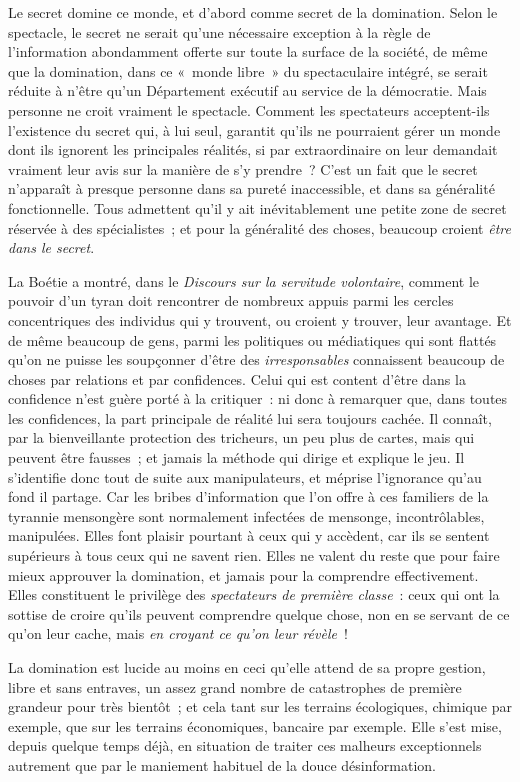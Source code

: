 \documentclass[french,twoside]{book} %
\def\mednobreak{\ifdim\lastskip<\medskipamount
  \removelastskip\nopagebreak\medskip\fi}
\newcommand{\labelblock}[1]{\medbreak{\noindent\color{rubric}\bfseries #1}\par\mednobreak}
\begin{document}
\labelblock{XXI}

\noindent Le secret domine ce monde, et d’abord comme secret de la domination. Selon le spectacle, le secret ne serait qu’une nécessaire exception à la règle de l’information abondamment offerte sur toute la surface de la société, de même que la domination, dans ce « monde libre » du spectaculaire intégré, se serait réduite à n’être qu’un Département exécutif au service de la démocratie. Mais personne ne croit vraiment le spectacle. Comment les spectateurs acceptent-ils l’existence du secret qui, à lui seul, garantit qu’ils ne pourraient gérer un monde dont ils ignorent les principales réalités, si par extraordinaire on leur demandait vraiment leur avis sur la manière de s’y prendre ? C’est un fait que le secret n’apparaît à presque personne dans sa pureté inaccessible, et dans sa généralité fonctionnelle. Tous admettent qu’il y ait inévitablement une petite zone de secret réservée à des spécialistes ; et pour la généralité des choses, beaucoup croient \emph{être dans le secret}.\par
La Boétie a montré, dans le \emph{Discours sur la servitude volontaire}, comment le pouvoir d’un tyran doit rencontrer de nombreux appuis parmi les cercles concentriques des individus qui y trouvent, ou croient y trouver, leur avantage. Et de même beaucoup de gens, parmi les politiques ou médiatiques qui sont flattés qu’on ne puisse les soupçonner d’être des \emph{irresponsables} connaissent beaucoup de choses par relations et par confidences. Celui qui est content d’être dans la confidence n’est guère porté à la critiquer : ni donc à remarquer que, dans toutes les confidences, la part principale de réalité lui sera toujours cachée. Il connaît, par la bienveillante protection des tricheurs, un peu plus de cartes, mais qui peuvent être fausses ; et jamais la méthode qui dirige et explique le jeu. Il s’identifie donc tout de suite aux manipulateurs, et méprise l’ignorance qu’au fond il partage. Car les bribes d’information que l’on offre à ces familiers de la tyrannie mensongère sont normalement infectées de mensonge, incontrôlables, manipulées. Elles font plaisir pourtant à ceux qui y accèdent, car ils se sentent supérieurs à tous ceux qui ne savent rien. Elles ne valent du reste que pour faire mieux approuver la domination, et jamais pour la comprendre effectivement. Elles constituent le privilège des \emph{spectateurs de première classe} : ceux qui ont la sottise de croire qu’ils peuvent comprendre quelque chose, non en se servant de ce qu’on leur cache, mais \emph{en croyant ce qu’on leur révèle} !\par
La domination est lucide au moins en ceci qu’elle attend de sa propre gestion, libre et sans entraves, un assez grand nombre de catastrophes de première grandeur pour très bientôt ; et cela tant sur les terrains écologiques, chimique par exemple, que sur les terrains économiques, bancaire par exemple. Elle s’est mise, depuis quelque temps déjà, en situation de traiter ces malheurs exceptionnels autrement que par le maniement habituel de la douce désinformation.\par
\end{document}

